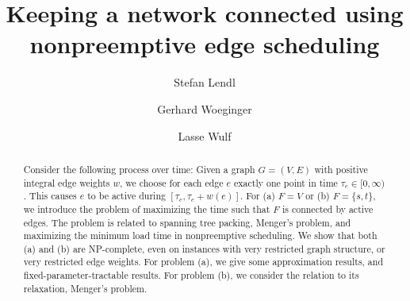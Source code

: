 \documentclass[runningheads]{llncs}
\numberwithin{equation}{section}
\newcommand{\set}[1]{\{ #1 \}}
\begin{document}
\title{Keeping a network connected using nonpreemptive edge scheduling}
%
%
\author{Stefan Lendl \and
Gerhard Woeginger \and
Lasse Wulf}
%
%
%
\maketitle              %
%
\begin{abstract}
Consider the following process over time: Given a graph $G = (V,E)$ with positive integral edge weights $w$, we choose for each edge $e$ exactly one point in time $\tau_e \in [0, \infty)$. This causes $e$ to be active during $[\tau_e, \tau_e + w(e)]$. For (a) $F = V$ or (b) $F = \set{s,t}$, we introduce the problem of maximizing the time such that $F$ is connected by active edges. The problem is related to spanning tree packing, Menger's problem, and maximizing the minimum load time in nonpreemptive scheduling. We show that both (a) and (b) are NP-complete, even on instances with very restricted graph structure, or very restricted edge weights. For problem (a), we give some approximation results, and fixed-parameter-tractable results. For problem (b), we consider the relation to its relaxation, Menger's problem. 
\end{abstract}
\end{document}
